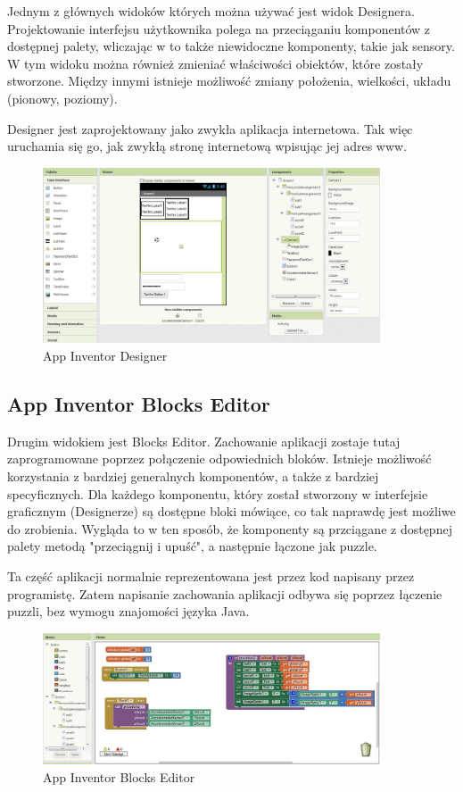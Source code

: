 Jednym z głównych widoków których można używać jest widok Designera. Projektowanie interfejsu użytkownika polega na przeciąganiu komponentów z dostępnej palety, wliczając w to także niewidoczne komponenty, takie jak sensory. W tym widoku można również zmieniać właściwości obiektów, które zostały stworzone. Między innymi istnieje możliwość zmiany położenia, wielkości, układu (pionowy, poziomy).

Designer jest zaprojektowany jako zwykła aplikacja internetowa. Tak więc uruchamia się go, jak zwykłą stronę internetową wpisując jej adres www.

\begin{figure}[th] 
\centering\includegraphics[width=10cm]{figures/designer}
\caption{App Inventor Designer}
\end{figure}

\subsection{App Inventor Blocks Editor}
\label{c222}

Drugim widokiem jest Blocks Editor. Zachowanie aplikacji zostaje tutaj zaprogramowane poprzez połączenie odpowiednich bloków. Istnieje możliwość korzystania z bardziej generalnych komponentów, a także z bardziej specyficznych. Dla każdego komponentu, który został stworzony w interfejsie graficznym (Designerze) są dostępne bloki mówiące, co tak naprawdę jest możliwe do zrobienia. Wygląda to w ten sposób, że komponenty są przciągane z dostępnej palety metodą "przeciągnij i upuść", a następnie łączone jak puzzle.

Ta część aplikacji normalnie reprezentowana jest przez kod napisany przez programistę. Zatem napisanie zachowania aplikacji odbywa się poprzez łączenie puzzli, bez wymogu znajomości języka Java.

\begin{figure}[th] 
\centering\includegraphics[width=10cm]{figures/editor}
\caption{App Inventor Blocks Editor}
\end{figure}


